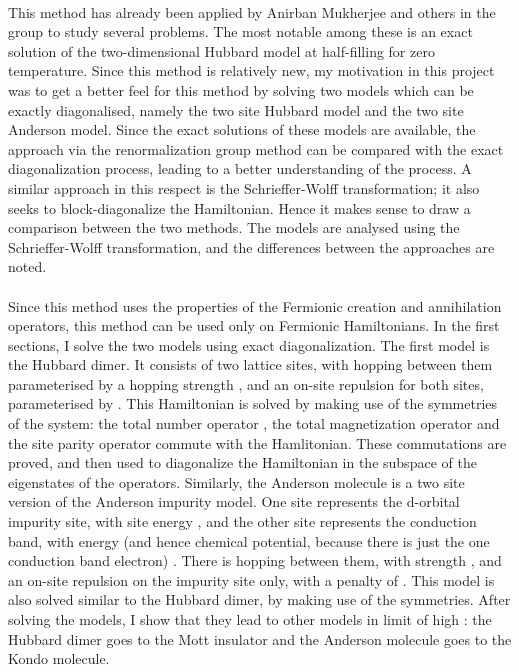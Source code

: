 \documentclass[12pt]{article}
\begin{document}
\paragraph{}
This method has already been applied by Anirban Mukherjee and others in the group to study several problems. The most notable among these is an exact solution of the two-dimensional Hubbard model at half-filling for zero temperature. Since this method is relatively new, my motivation in this project was to get a better feel for this method by solving two models which can be exactly diagonalised, namely the two site Hubbard model and the two site Anderson model. Since the exact solutions of these models are available, the approach via the renormalization group method can be compared with the exact diagonalization process, leading to a better understanding of the process. A similar approach in this respect is the Schrieffer-Wolff transformation; it also seeks to block-diagonalize the Hamiltonian. Hence it makes sense to draw a comparison between the two methods. The models are analysed using the Schrieffer-Wolff transformation, and the differences between the approaches are noted.
\paragraph{}
Since this method uses the properties of the Fermionic creation and annihilation operators, this method can be used only on Fermionic Hamiltonians. In the first sections, I solve the two models using exact diagonalization. The first model is the Hubbard dimer. It consists of two lattice sites, with hopping between them parameterised by a hopping strength , and an on-site repulsion for both sites, parameterised by . This Hamiltonian is solved by making use of the symmetries of the system: the total number operator , the total magnetization operator  and the site parity operator  commute with the Hamlitonian. These commutations are proved, and then used to diagonalize the Hamiltonian in the subspace of the eigenstates of the operators. Similarly, the Anderson molecule is a two site version of the Anderson impurity model. One site represents the d-orbital impurity site, with site energy , and the other site represents the conduction band, with energy (and hence chemical potential, because there is just the one conduction band electron) . There is hopping between them, with strength , and an on-site repulsion on the impurity site only, with a penalty of . This model is also solved similar to the Hubbard dimer, by making use of the symmetries. After solving the models, I show that they lead to other models in limit of high : the Hubbard dimer goes to the Mott insulator and the Anderson molecule goes to the Kondo molecule.
\end{document}
